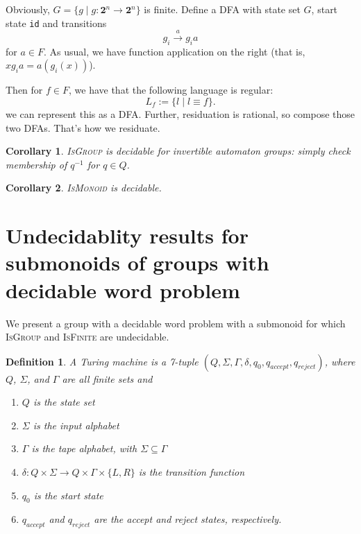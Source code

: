 \documentclass[10pt]{article} %
\newtheorem{corollary}{Corollary}
\newtheorem{definition}{Definition}
\newcommand{\defn}[1]{\textit{#1}}
\newcommand{\decprob}[1]{\textsc{#1}}
\begin{document}
    Obviously, $G = \{ g \mid g : \textbf{2}^n \rightarrow \textbf{2}^n \}$ is finite. Define a DFA with state set $G$, start state \texttt{id} and transitions
    \[
    g_i \stackrel{a}{\longrightarrow} g_i a
    \]
    for $a \in F$. As usual, we have function application on the right (that is, $x g_i a = a(g_i(x))$).

    Then for $f \in F$, we have that the following language is regular:
    \[
    L_{f} := \{l \mid l \equiv f \}.
    \]
    we can represent this as a DFA. Further, residuation is rational, so compose those two DFAs. That's how we residuate.


    \begin{corollary}
    \decprob{IsGroup} is decidable for invertible automaton groups: simply check membership of $q^{-1}$ for $q \in Q$.
    \end{corollary}

    \begin{corollary}
    \decprob{IsMonoid} is decidable.
    \end{corollary}

    \section{Undecidablity results for submonoids of groups with decidable word problem}

    We present a group with a decidable word problem with a submonoid for which \textsc{IsGroup} and \textsc{IsFinite} are undecidable. 

    \begin{definition}
    A \defn{Turing machine} is a 7-tuple $(Q, \Sigma, \Gamma, \delta, q_0, q_{accept}, q_{reject})$, where $Q$, $\Sigma$, and $\Gamma$ are all finite sets and 
    \begin{enumerate}
    \item $Q$ is the state set
    \item $\Sigma$ is the input alphabet
    \item $\Gamma$ is the tape alphabet, with $\Sigma \subseteq \Gamma$
    \item $\delta : Q \times \Sigma \rightarrow Q \times \Gamma \times \{L, R \}$ is the transition function
    \item $q_0$ is the start state
    \item $q_{accept}$ and $q_{reject}$ are the accept and reject states, respectively.
    \end{enumerate}
    \end{definition}
\end{document}
